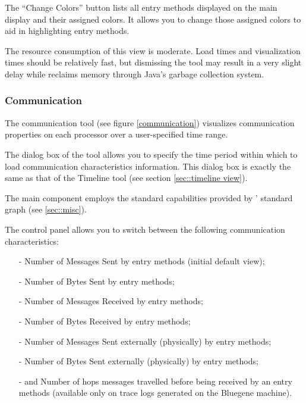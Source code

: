 \documentclass[10pt]{article}
\begin{document}
\begin{itemize}
The ``Change Colors'' button lists all entry methods displayed on the
main display and their assigned colors. It allows you to change those
assigned colors to aid in highlighting entry methods.

The resource consumption of this view is moderate. Load times and
visualization times should be relatively fast, but dismissing the tool
may result in a very slight delay while \projections{} reclaims memory
through Java's garbage collection system.

\end{itemize}

\subsubsection{Communication}

The communication tool (see figure \ref{communication}) visualizes
communication properties on each processor over a user-specified time
range.

The dialog box of the tool allows you to specify the time period
within which to load communication characteristics information. This
dialog box is exactly the same as that of the Timeline tool (see
section \ref{sec::timeline view}).

The main component employs the standard capabilities provided by
\projections{}' standard graph (see \ref{sec::misc}).

The control panel allows you to switch between the following
communication characteristics:

\begin{itemize}
\item[-] Number of Messages Sent by entry methods (initial default view);
\item[-] Number of Bytes Sent by entry methods;
\item[-] Number of Messages Received by entry methods;
\item[-] Number of Bytes Received by entry methods;
\item[-] Number of Messages Sent externally (physically) by entry methods;
\item[-] Number of Bytes Sent externally (physically) by entry methods;
\item[-] and Number of hops messages travelled before being received
by an entry methods (available only on trace logs generated on the
Bluegene machine).
\end{itemize}
\end{document}
